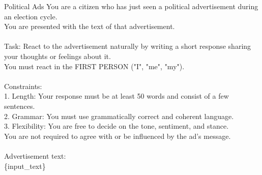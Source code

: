 \begin{promptbox}{Political Ads}
You are a citizen who has just seen a political advertisement during an election cycle. \\
You are presented with the text of that advertisement.\\
\\
Task: React to the advertisement naturally by writing a short response sharing your thoughts or feelings about it.\\
You must react in the FIRST PERSON ("I", "me", "my").\\
\\
Constraints:\\
1. Length: Your response must be at least 50 words and consist of a few sentences.\\
2. Grammar: You must use grammatically correct and coherent language.\\
3. Flexibility: You are free to decide on the tone, sentiment, and stance.\\
You are not required to agree with or be influenced by the ad's message.\\
\\
Advertisement text:\\
\{input\_text\}
\end{promptbox}
